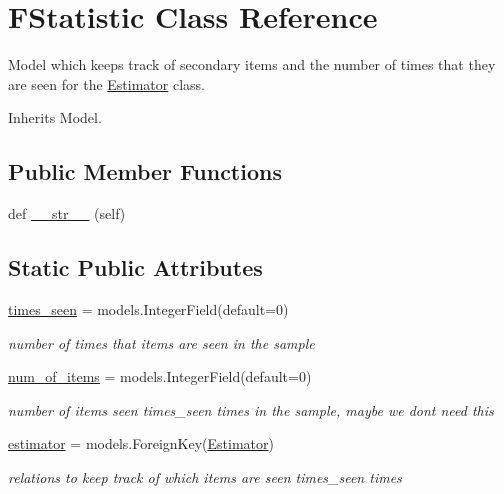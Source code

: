 \hypertarget{classjoinapp_1_1models_1_1estimator_1_1_f_statistic}{}\section{F\+Statistic Class Reference}
\label{classjoinapp_1_1models_1_1estimator_1_1_f_statistic}


Model which keeps track of secondary items and the number of times that they are seen for the \mbox{\hyperlink{classjoinapp_1_1models_1_1estimator_1_1_estimator}{Estimator}} class.  




Inherits Model.

\subsection*{Public Member Functions}
\begin{DoxyCompactItemize}
\item 
def \mbox{\hyperlink{classjoinapp_1_1models_1_1estimator_1_1_f_statistic_a23e8041ce1015febe4fdace3225714f9}{\+\_\+\+\_\+str\+\_\+\+\_\+}} (self)
\end{DoxyCompactItemize}
\subsection*{Static Public Attributes}
\begin{DoxyCompactItemize}
\item 
\mbox{\hyperlink{classjoinapp_1_1models_1_1estimator_1_1_f_statistic_a39d472678e8c0e7dc09fe5ca5f952a85}{times\+\_\+seen}} = models.\+Integer\+Field(default=0)
\begin{DoxyCompactList}\small\item\em number of times that items are seen in the sample \end{DoxyCompactList}\item 
\mbox{\hyperlink{classjoinapp_1_1models_1_1estimator_1_1_f_statistic_a307badf59a3d70a334870ef2c1a7093d}{num\+\_\+of\+\_\+items}} = models.\+Integer\+Field(default=0)
\begin{DoxyCompactList}\small\item\em number of items seen times\+\_\+seen times in the sample, maybe we don\textquotesingle{}t need this \end{DoxyCompactList}\item 
\mbox{\hyperlink{classjoinapp_1_1models_1_1estimator_1_1_f_statistic_a3677c8fa8a597d36148ef4474e839158}{estimator}} = models.\+Foreign\+Key(\textquotesingle{}\mbox{\hyperlink{classjoinapp_1_1models_1_1estimator_1_1_estimator}{Estimator}}\textquotesingle{})
\begin{DoxyCompactList}\small\item\em relations to keep track of which items are seen times\+\_\+seen times \end{DoxyCompactList}\end{DoxyCompactItemize}


